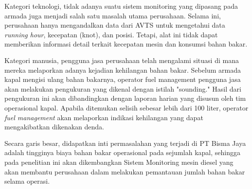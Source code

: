 Kategori teknologi, tidak adanya suatu sistem monitoring yang dipasang pada armada juga menjadi salah satu masalah utama perusahaan. Selama ini, perusahaan hanya mengandalkan data dari AVTS untuk mengetahui data \textit{running hour}, kecepatan (knot), dan posisi. Tetapi, alat ini tidak dapat memberikan informasi detail terkait kecepatan mesin dan konsumsi bahan bakar.

Kategori manusia, pengguna jasa perusahaan telah mengalami situasi di mana mereka melaporkan adanya kejadian kehilangan bahan bakar. Sebelum armada kapal mengisi ulang bahan bakarnya, operator fuel management pengguna jasa akan melakukan pengukuran yang dikenal dengan istilah "sounding." Hasil dari pengukuran ini akan dibandingkan dengan laporan harian yang disusun oleh tim operasional kapal. Apabila ditemukan selisih sebesar lebih dari 100 liter, operator \textit{fuel management} akan melaporkan indikasi kehilangan yang dapat mengakibatkan dikenakan denda.

Secara garis besar, didapatkan inti permasalahan yang terjadi di PT Bisma Jaya adalah tingginya biaya bahan bakar operasional pada sejumlah kapal, sehingga pada penelitian ini akan dikembangkan Sistem Monitoring mesin diesel yang akan membantu perusahaan dalam melakukan pemantauan jumlah bahan bakar selama operasi.
